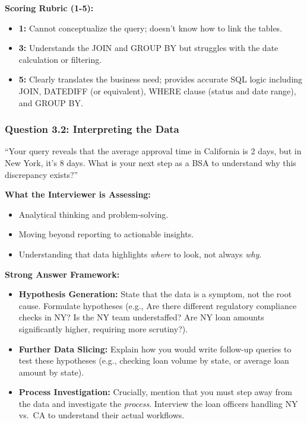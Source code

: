 \documentclass[
  11pt,
  openany,
  oneside]{book}
\providecommand{\tightlist}{%
  \setlength{\itemsep}{0pt}\setlength{\parskip}{0pt}}
\begin{document}
\textbf{Scoring Rubric (1-5):}

\begin{itemize}
\tightlist
\item
  \textbf{1:} Cannot conceptualize the query; doesn't know how to link
  the tables.
\item
  \textbf{3:} Understands the JOIN and GROUP BY but struggles with the
  date calculation or filtering.
\item
  \textbf{5:} Clearly translates the business need; provides accurate
  SQL logic including JOIN, DATEDIFF (or equivalent), WHERE clause
  (status and date range), and GROUP BY.
\end{itemize}

\subsubsection{Question 3.2: Interpreting the
Data}\label{question-3.2-interpreting-the-data}

``Your query reveals that the average approval time in California is 2
days, but in New York, it's 8 days. What is your next step as a BSA to
understand why this discrepancy exists?''

\textbf{What the Interviewer is Assessing:}

\begin{itemize}
\tightlist
\item
  Analytical thinking and problem-solving.
\item
  Moving beyond reporting to actionable insights.
\item
  Understanding that data highlights \emph{where} to look, not always
  \emph{why}.
\end{itemize}

\textbf{Strong Answer Framework:}

\begin{itemize}
\tightlist
\item
  \textbf{Hypothesis Generation:} State that the data is a symptom, not
  the root cause. Formulate hypotheses (e.g., Are there different
  regulatory compliance checks in NY? Is the NY team understaffed? Are
  NY loan amounts significantly higher, requiring more scrutiny?).
\item
  \textbf{Further Data Slicing:} Explain how you would write follow-up
  queries to test these hypotheses (e.g., checking loan volume by state,
  or average loan amount by state).
\item
  \textbf{Process Investigation:} Crucially, mention that you must step
  away from the data and investigate the \emph{process}. Interview the
  loan officers handling NY vs.~CA to understand their actual workflows.
\end{itemize}
\end{document}
